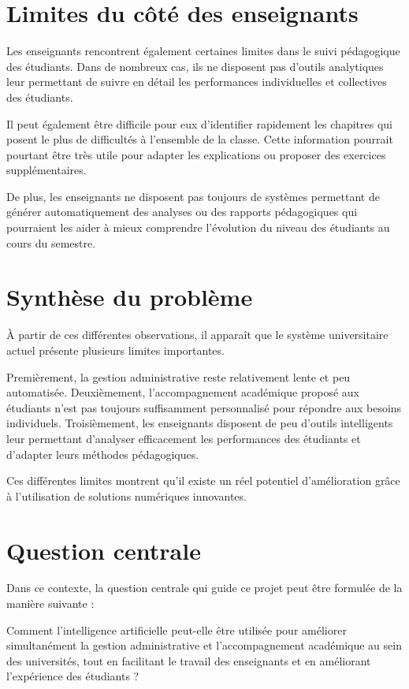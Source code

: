 \documentclass[12pt,a4paper]{report}
\begin{document}
\section{Limites du côté des enseignants}
Les enseignants rencontrent également certaines limites dans le suivi pédagogique des étudiants. Dans de nombreux cas, ils ne disposent pas d'outils analytiques leur permettant de suivre en détail les performances individuelles et collectives des étudiants.

Il peut également être difficile pour eux d'identifier rapidement les chapitres qui posent le plus de difficultés à l'ensemble de la classe. Cette information pourrait pourtant être très utile pour adapter les explications ou proposer des exercices supplémentaires.

De plus, les enseignants ne disposent pas toujours de systèmes permettant de générer automatiquement des analyses ou des rapports pédagogiques qui pourraient les aider à mieux comprendre l'évolution du niveau des étudiants au cours du semestre.

\section{Synthèse du problème}
À partir de ces différentes observations, il apparaît que le système universitaire actuel présente plusieurs limites importantes.

Premièrement, la gestion administrative reste relativement lente et peu automatisée. Deuxièmement, l'accompagnement académique proposé aux étudiants n'est pas toujours suffisamment personnalisé pour répondre aux besoins individuels. Troisièmement, les enseignants disposent de peu d'outils intelligents leur permettant d'analyser efficacement les performances des étudiants et d'adapter leurs méthodes pédagogiques.

Ces différentes limites montrent qu'il existe un réel potentiel d'amélioration grâce à l'utilisation de solutions numériques innovantes.

\section{Question centrale}
Dans ce contexte, la question centrale qui guide ce projet peut être formulée de la manière suivante :

\begin{tcolorbox}[colback=blue!5!white,colframe=blue!75!black,title=Problématique principale]
Comment l'intelligence artificielle peut-elle être utilisée pour améliorer simultanément la gestion administrative et l'accompagnement académique au sein des universités, tout en facilitant le travail des enseignants et en améliorant l'expérience des étudiants ?
\end{tcolorbox}
\end{document}
